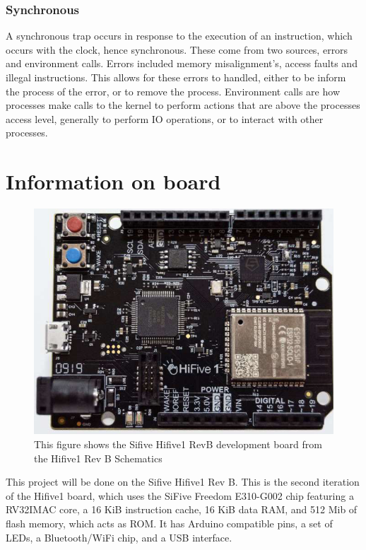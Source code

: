 \subsubsection{Synchronous}
A synchronous trap occurs in response to the execution of an instruction, which occurs with the clock, hence synchronous. These come from two sources, errors and environment calls. Errors included memory misalignment's, access faults and illegal instructions. This allows for these errors to handled, either to be inform the process of the error, or to remove the process. Environment calls are how processes make calls to the kernel to perform actions that are above the processes access level, generally to perform IO operations, or to interact with other processes.
\section{Information on board}
\begin{figure}[H]
    \includegraphics[width=0.6\columnwidth]{figures/board_image.png}
    \centering
    \caption[Sifive Hifive1 RevB]{This figure shows the Sifive Hifive1 RevB development board from the Hifive1 Rev B Schematics\cite{sifive_schematics}}
\end{figure}
This project will be done on the Sifive Hifive1 Rev B. This is the second iteration of the Hifive1 board, which uses the SiFive Freedom E310-G002 chip featuring a RV32IMAC core, a 16 KiB instruction cache, 16 KiB data RAM, and 512 Mib of flash memory, which acts as ROM. It has Arduino compatible pins, a set of LEDs, a Bluetooth/WiFi chip, and a USB interface.